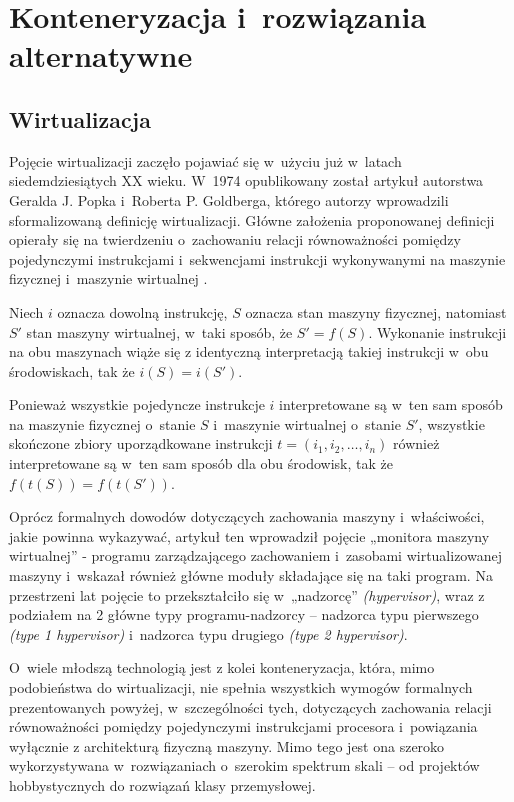 
\section{Konteneryzacja i~rozwiązania alternatywne}
\subsection{Wirtualizacja}
Pojęcie wirtualizacji zaczęło pojawiać się w~użyciu już w~latach siedemdziesiątych XX wieku. W~1974 opublikowany został artykuł autorstwa Geralda J. Popka i~Roberta P. Goldberga, którego autorzy wprowadzili sformalizowaną definicję wirtualizacji. Główne założenia proponowanej definicji opierały się na twierdzeniu o~zachowaniu relacji równoważności pomiędzy pojedynczymi instrukcjami i~sekwencjami instrukcji wykonywanymi na maszynie fizycznej i~maszynie wirtualnej \cite{virtualization}.

\begin{lemat}
	Niech $i$ oznacza dowolną instrukcję, $S$ oznacza stan maszyny fizycznej, natomiast $S'$ stan maszyny wirtualnej, w~taki sposób, że $S' = f(S)$. Wykonanie instrukcji na obu maszynach wiąże się z identyczną interpretacją takiej instrukcji w~obu środowiskach, tak że $i(S) = i(S')$.
\end{lemat}

\begin{lemat}
	Ponieważ wszystkie pojedyncze instrukcje $i$ interpretowane są w~ten sam sposób na maszynie fizycznej o~stanie $S$ i~maszynie wirtualnej o~stanie $S'$, wszystkie skończone zbiory uporządkowane instrukcji $t = (i_1, i_2, \ldots, i_n)$ również interpretowane są w~ten sam sposób dla obu środowisk, tak że $f(t(S)) = f(t(S'))$.
\end{lemat}

\noindent Oprócz formalnych dowodów dotyczących zachowania maszyny i~właściwości, jakie powinna wykazywać, artykuł ten wprowadził pojęcie „monitora maszyny wirtualnej” - programu zarządzającego zachowaniem i~zasobami wirtualizowanej maszyny i~wskazał również główne moduły składające się na taki program. Na przestrzeni lat pojęcie to przekształciło się w~„nadzorcę” \textit{(hypervisor)}, wraz z podziałem na 2 główne typy programu-nadzorcy -- nadzorca typu pierwszego \textit{(type 1 hypervisor)} i~nadzorca typu drugiego \textit{(type 2 hypervisor)}.

\noindent O~wiele młodszą technologią jest z kolei konteneryzacja, która, mimo podobieństwa do wirtualizacji, nie spełnia wszystkich wymogów formalnych prezentowanych powyżej, w~szczególności tych, dotyczących zachowania relacji równoważności pomiędzy pojedynczymi instrukcjami procesora i~powiązania wyłącznie z architekturą fizyczną maszyny. Mimo tego jest ona szeroko wykorzystywana w~rozwiązaniach o~szerokim spektrum skali -- od projektów hobbystycznych do rozwiązań klasy przemysłowej.

